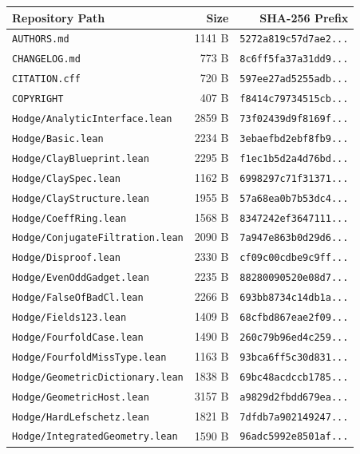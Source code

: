 \documentclass[11pt,a4paper]{article}
\begin{document}
\begin{center}
\small
\begin{tabular}{p{}rr}
\toprule
\textbf{Repository Path} & \textbf{Size} & \textbf{SHA-256 Prefix} \\
\midrule
\texttt{AUTHORS.md} & 1141 B & \texttt{5272a819c57d7ae2...} \\
\texttt{CHANGELOG.md} & 773 B & \texttt{8c6ff5fa37a31dd9...} \\
\texttt{CITATION.cff} & 720 B & \texttt{597ee27ad5255adb...} \\
\texttt{COPYRIGHT} & 407 B & \texttt{f8414c79734515cb...} \\
\texttt{Hodge/AnalyticInterface.lean} & 2859 B & \texttt{73f02439d9f8169f...} \\
\texttt{Hodge/Basic.lean} & 2234 B & \texttt{3ebaefbd2ebf8fb9...} \\
\texttt{Hodge/ClayBlueprint.lean} & 2295 B & \texttt{f1ec1b5d2a4d76bd...} \\
\texttt{Hodge/ClaySpec.lean} & 1162 B & \texttt{6998297c71f31371...} \\
\texttt{Hodge/ClayStructure.lean} & 1955 B & \texttt{57a68ea0b7b53dc4...} \\
\texttt{Hodge/CoeffRing.lean} & 1568 B & \texttt{8347242ef3647111...} \\
\texttt{Hodge/ConjugateFiltration.lean} & 2090 B & \texttt{7a947e863b0d29d6...} \\
\texttt{Hodge/Disproof.lean} & 2330 B & \texttt{cf09c00cdbe9c9ff...} \\
\texttt{Hodge/EvenOddGadget.lean} & 2235 B & \texttt{88280090520e08d7...} \\
\texttt{Hodge/FalseOfBadCl.lean} & 2266 B & \texttt{693bb8734c14db1a...} \\
\texttt{Hodge/Fields123.lean} & 1409 B & \texttt{68cfbd867eae2f09...} \\
\texttt{Hodge/FourfoldCase.lean} & 1490 B & \texttt{260c79b96ed4c259...} \\
\texttt{Hodge/FourfoldMissType.lean} & 1163 B & \texttt{93bca6ff5c30d831...} \\
\texttt{Hodge/GeometricDictionary.lean} & 1838 B & \texttt{69bc48acdccb1785...} \\
\texttt{Hodge/GeometricHost.lean} & 3157 B & \texttt{a9829d2fbdd679ea...} \\
\texttt{Hodge/HardLefschetz.lean} & 1821 B & \texttt{7dfdb7a902149247...} \\
\texttt{Hodge/IntegratedGeometry.lean} & 1590 B & \texttt{96adc5992e8501af...} \\

\end{tabular}
\end{center}
\end{document}
